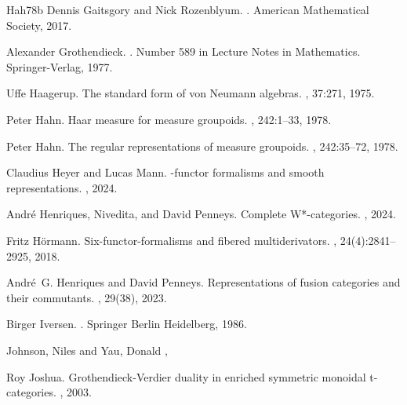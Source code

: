 \documentclass[10pt,a4paper,oneside]{amsart}
\theoremstyle{remark}
\theoremstyle{definition}
\begin{document}
\begin{thebibliography}{Hah78b}
	Dennis Gaitsgory and Nick Rozenblyum.
	.
	\newblock American Mathematical Society, 2017.
	
	Alexander Grothendieck.
	.
	\newblock Number 589 in Lecture Notes in Mathematics. Springer-Verlag, 1977.
	
	Uffe Haagerup.
	\newblock The standard form of von {N}eumann algebras.
	, 37:271, 1975.
	
	Peter Hahn.
	\newblock Haar measure for measure groupoids.
	, 242:1--33,
	1978.
	
	Peter Hahn.
	\newblock The regular representations of measure groupoids.
	, 242:35--72,
	1978.
	
	Claudius Heyer and Lucas Mann.
	-functor formalisms and smooth representations.
	, 2024.
	
	André Henriques, Nivedita, and David Penneys.
	\newblock Complete {W}*-categories.
	, 2024.
	
	Fritz H{\"o}rmann.
	\newblock Six-functor-formalisms and fibered multiderivators.
	, 24(4):2841--2925, 2018.
	
	Andr\'e~G. Henriques and David Penneys.
	\newblock Representations of fusion categories and their commutants.
	, 29(38), 2023.
	
	Birger Iversen.
	.
	\newblock Springer Berlin Heidelberg, 1986.

Johnson, Niles and Yau, Donald
,

	Roy Joshua.
	\newblock Grothendieck-{V}erdier duality in enriched symmetric monoidal
	t-categories.
	, 2003.
	

\end{thebibliography}
\end{document}
